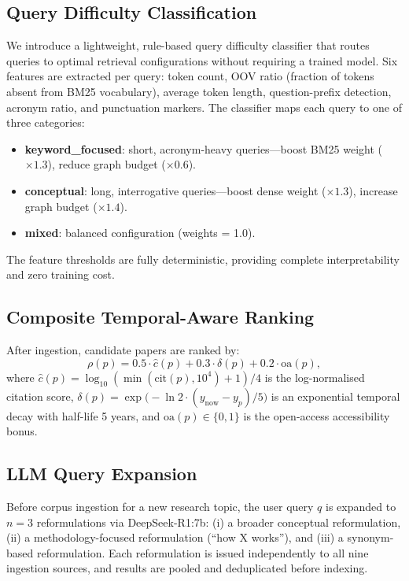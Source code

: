 \documentclass[journal]{IEEEtran}
\begin{document}
\subsection{Query Difficulty Classification}
\label{sec:qclass}
We introduce a lightweight, rule-based query difficulty classifier
that routes queries to optimal retrieval configurations without
requiring a trained model. Six features are extracted per query:
token count, OOV ratio (fraction of tokens absent from BM25
vocabulary), average token length, question-prefix detection,
acronym ratio, and punctuation markers. The classifier maps each
query to one of three categories:
\begin{itemize}[leftmargin=1.5em,itemsep=1pt]
  \item \textbf{keyword\_focused}: short, acronym-heavy queries—boost
    BM25 weight ($\times 1.3$), reduce graph budget ($\times 0.6$).
  \item \textbf{conceptual}: long, interrogative queries—boost
    dense weight ($\times 1.3$), increase graph budget ($\times 1.4$).
  \item \textbf{mixed}: balanced configuration (weights = 1.0).
\end{itemize}
The feature thresholds are fully deterministic, providing complete
interpretability and zero training cost.

\subsection{Composite Temporal-Aware Ranking}
\label{sec:composite}
After ingestion, candidate papers are ranked by:
\begin{equation}
  \rho(p) = 0.5 \cdot \hat{c}(p)
           + 0.3 \cdot \delta(p)
           + 0.2 \cdot \mathrm{oa}(p),
  \label{eq:composite}
\end{equation}
where $\hat{c}(p) = \log_{10}(\min(\text{cit}(p), 10^4)+1) / 4$
is the log-normalised citation score, $\delta(p) =
\exp\!\bigl(-\ln 2 \cdot (y_{\mathrm{now}} - y_p)/5\bigr)$ is an
exponential temporal decay with half-life 5 years, and
$\mathrm{oa}(p) \in \{0,1\}$ is the open-access accessibility bonus.

\subsection{LLM Query Expansion}
Before corpus ingestion for a new research topic, the user query
$q$ is expanded to $n=3$ reformulations via DeepSeek-R1:7b:
(i) a broader conceptual reformulation,
(ii) a methodology-focused reformulation (``how X works''), and
(iii) a synonym-based reformulation.
Each reformulation is issued independently to all nine ingestion
sources, and results are pooled and deduplicated before indexing.
\end{document}
